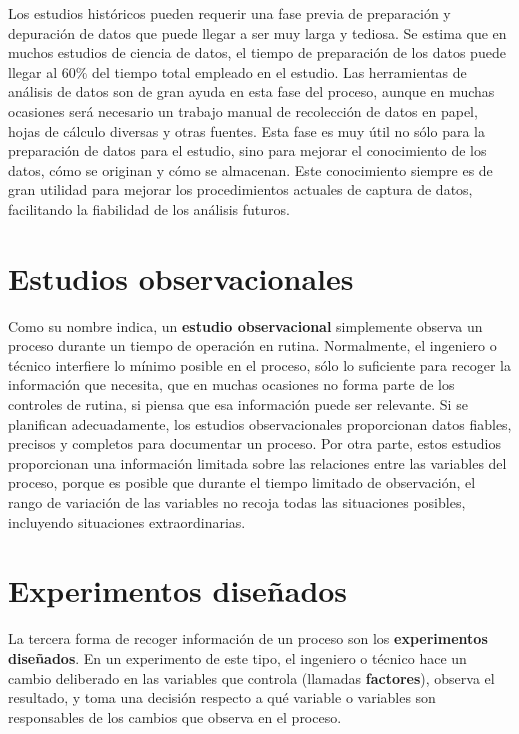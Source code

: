 \documentclass[
  letterpaper,
  DIV=11,
  numbers=noendperiod,
  oneside]{scrreprt}
\begin{document}
Los estudios históricos pueden requerir una fase previa de preparación y
depuración de datos que puede llegar a ser muy larga y tediosa. Se
estima que en muchos estudios de ciencia de datos, el tiempo de
preparación de los datos puede llegar al \(60\%\) del tiempo total
empleado en el estudio. Las herramientas de análisis de datos son de
gran ayuda en esta fase del proceso, aunque en muchas ocasiones será
necesario un trabajo manual de recolección de datos en papel, hojas de
cálculo diversas y otras fuentes. Esta fase es muy útil no sólo para la
preparación de datos para el estudio, sino para mejorar el conocimiento
de los datos, cómo se originan y cómo se almacenan. Este conocimiento
siempre es de gran utilidad para mejorar los procedimientos actuales de
captura de datos, facilitando la fiabilidad de los análisis futuros.

\hypertarget{estudios-observacionales}{%
\section{Estudios observacionales}\label{estudios-observacionales}}

Como su nombre indica, un \textbf{estudio observacional} simplemente
observa un proceso durante un tiempo de operación en rutina.
Normalmente, el ingeniero o técnico interfiere lo mínimo posible en el
proceso, sólo lo suficiente para recoger la información que necesita,
que en muchas ocasiones no forma parte de los controles de rutina, si
piensa que esa información puede ser relevante. Si se planifican
adecuadamente, los estudios observacionales proporcionan datos fiables,
precisos y completos para documentar un proceso. Por otra parte, estos
estudios proporcionan una información limitada sobre las relaciones
entre las variables del proceso, porque es posible que durante el tiempo
limitado de observación, el rango de variación de las variables no
recoja todas las situaciones posibles, incluyendo situaciones
extraordinarias.

\hypertarget{experimentos-diseuxf1ados}{%
\section{Experimentos diseñados}\label{experimentos-diseuxf1ados}}

{}

La tercera forma de recoger información de un proceso son los
\textbf{experimentos diseñados}. En un experimento de este tipo, el
ingeniero o técnico hace un cambio deliberado en las variables que
controla (llamadas \textbf{factores}), observa el resultado, y toma una
decisión respecto a qué variable o variables son responsables de los
cambios que observa en el proceso.
\end{document}
